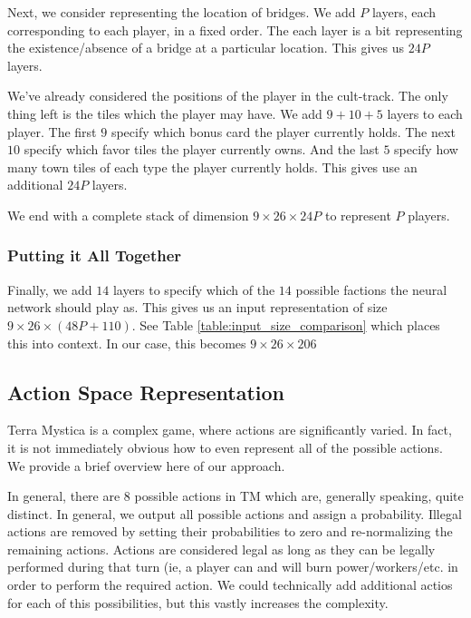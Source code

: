 \documentclass[8pt,twocolumn]{article}
\begin{document}
Next, we consider representing the location of bridges. We add $P$ layers, each corresponding to each player, in a fixed order. The each layer is a bit representing the existence/absence of a bridge at a particular location. This gives us $24P$ layers.

We've already considered the positions of the player in the cult-track. The only thing left is the tiles which the player may have. We add $9 + 10 + 5$ layers to each player. The first $9$ specify which bonus card the player currently holds. The next $10$ specify which favor tiles the player currently owns. And the last $5$ specify how many town tiles of each type the player currently holds. This gives use an additional $24P$ layers.

We end with a complete stack of dimension $9 \times 26 \times 24P$ to represent $P$ players.

\subsubsection{Putting it All Together}
\label{subsubsection:final_input}
Finally, we add $14$ layers to specify which of the $14$ possible factions the neural network should play as. This gives us an input representation of size $9 \times 26 \times (48P + 110)$. See Table \ref{table:input_size_comparison} which places this into context. In our case, this becomes $9 \times 26 \times 206$

\subsection{Action Space Representation}
\label{section:action_space_representation}
Terra Mystica is a complex game, where actions are significantly varied. In fact, it is not immediately obvious how to even represent all of the possible actions. We provide a brief overview here of our approach.

In general, there are 8 possible actions in TM which are, generally speaking, quite distinct. In general, we output all possible actions and assign a probability. Illegal actions are removed by setting their probabilities to zero and re-normalizing the remaining actions. Actions are considered legal as long as they can be legally performed during that turn (ie, a player can and will burn power/workers/etc. in order to perform the required action. We could technically add additional actios for each of this possibilities, but this vastly increases the complexity.
\end{document}
